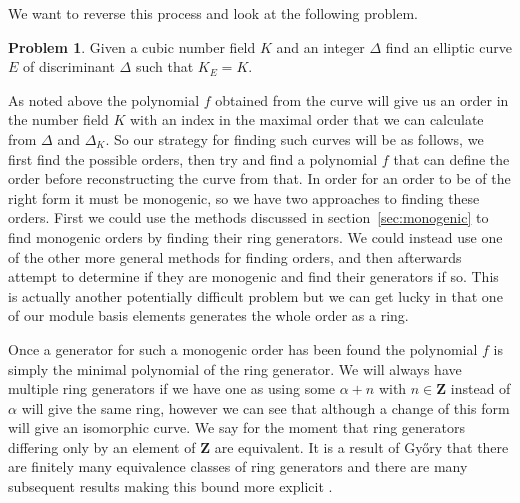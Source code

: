 \documentclass[12pt,a4paper,abstracton,bibtotoc]{scrreprt}
\theoremstyle{definition}
\newtheorem{prob}{Problem}
\newcommand{\ZZ}{\mathbf{Z}}
\begin{document}
We want to reverse this process and look at the following problem.

\begin{prob}
Given a cubic number field $K$ and an integer $\Delta$ find an elliptic curve $E$ of discriminant $\Delta$ such that $K_E = K$.
\end{prob}

As noted above the polynomial $f$ obtained from the curve will give us an order in the number field $K$ with an index in the maximal order that we can calculate from $\Delta$ and $\Delta_K$.
So our strategy for finding such curves will be as follows, we first find the possible orders, then try and find a polynomial $f$ that can define the order before reconstructing the curve from that.
In order for an order to be of the right form it must be monogenic, so we have two approaches to finding these orders.
First we could use the methods discussed in section~\ref{sec:monogenic} to find monogenic orders by finding their ring generators.
We could instead use one of the other more general methods for finding orders, and then afterwards attempt to determine if they are monogenic and find their generators if so.
This is actually another potentially difficult problem but we can get lucky in that one of our module basis elements generates the whole order as a ring.

Once a generator for such a monogenic order has been found the polynomial $f$ is simply the minimal polynomial of the ring generator.
We will always have multiple ring generators if we have one as using some $\alpha + n$ with $n\in \ZZ$ instead of $\alpha$ will give the same ring, however we can see that although a change of this form will give an isomorphic curve.
We say for the moment that ring generators differing only by an element of $\ZZ$ are equivalent.
It is a result of Gy\H{o}ry that there are finitely many equivalence classes of ring generators and there are many subsequent results making this bound more explicit \cite{monogenic}.
\end{document}
